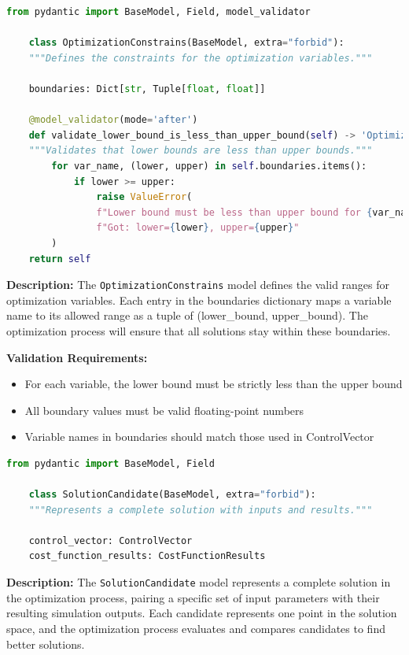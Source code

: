 \begin{lstlisting}[language=Python, caption={OptimizationConstrains model with validation logic}]
	from pydantic import BaseModel, Field, model_validator

	class OptimizationConstrains(BaseModel, extra="forbid"):
	"""Defines the constraints for the optimization variables."""

	boundaries: Dict[str, Tuple[float, float]]

	@model_validator(mode='after')
	def validate_lower_bound_is_less_than_upper_bound(self) -> 'OptimizationConstrains':
	"""Validates that lower bounds are less than upper bounds."""
		for var_name, (lower, upper) in self.boundaries.items():
			if lower >= upper:
				raise ValueError(
				f"Lower bound must be less than upper bound for {var_name}. "
				f"Got: lower={lower}, upper={upper}"
		)
	return self
\end{lstlisting}


\textbf{Description:}
The \texttt{OptimizationConstrains} model defines the valid ranges for optimization variables. Each entry in the boundaries dictionary maps a variable name to its allowed range as a tuple of (lower\_bound, upper\_bound). The optimization process will ensure that all solutions stay within these boundaries.

\textbf{Validation Requirements:}
\begin{itemize}
	\item For each variable, the lower bound must be strictly less than the upper bound
	\item All boundary values must be valid floating-point numbers
	\item Variable names in boundaries should match those used in ControlVector
\end{itemize}

\begin{lstlisting}[language=Python, caption={SolutionCandidate model definition}]
	from pydantic import BaseModel, Field

	class SolutionCandidate(BaseModel, extra="forbid"):
	"""Represents a complete solution with inputs and results."""

	control_vector: ControlVector
	cost_function_results: CostFunctionResults
\end{lstlisting}

\textbf{Description:}
The \texttt{SolutionCandidate} model represents a complete solution in the optimization process, pairing a specific set of input parameters with their resulting simulation outputs. Each candidate represents one point in the solution space, and the optimization process evaluates and compares candidates to find better solutions.

